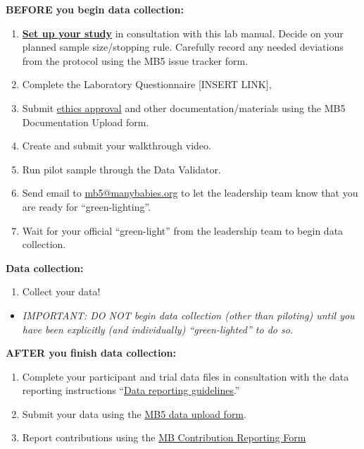 \documentclass[
]{book}
\providecommand{\tightlist}{%
  \setlength{\itemsep}{0pt}\setlength{\parskip}{0pt}}
\begin{document}
\textbf{BEFORE you begin data collection:}

\begin{enumerate}
\def\labelenumi{\arabic{enumi}.}
\setcounter{enumi}{3}
\tightlist
\item
  \hyperref[setting-up-the-experiment]{\textbf{Set up your study}} in consultation with this lab manual. Decide on your planned sample size/stopping rule. Carefully record any needed deviations from the protocol using the MB5 issue tracker form.
\item
  Complete the Laboratory Questionnaire {[}INSERT LINK{]},
\item
  Submit \hyperref[ethics-approval]{ethics approval} and other documentation/materials using the MB5 Documentation Upload form.
\item
  Create and submit your walkthrough video.
\item
  Run pilot sample through the Data Validator.
\item
  Send email to \url{mb5@manybabies.org} to let the leadership team know that you are ready for ``green-lighting''.
\item
  Wait for your official ``green-light'' from the leadership team to begin data collection.
\end{enumerate}

\textbf{Data collection:}

\begin{enumerate}
\def\labelenumi{\arabic{enumi}.}
\setcounter{enumi}{10}
\tightlist
\item
  Collect your data!
\end{enumerate}

\begin{itemize}
\tightlist
\item
  \emph{IMPORTANT: DO NOT begin data collection (other than piloting) until you have been explicitly (and individually) ``green-lighted'' to do so.}
\end{itemize}

\textbf{AFTER you finish data collection:}

\begin{enumerate}
\def\labelenumi{\arabic{enumi}.}
\setcounter{enumi}{11}
\tightlist
\item
  Complete your participant and trial data files in consultation with the data reporting instructions ``\hyperref[data-reporting-guidelines]{Data reporting guidelines}.''
\item
  Submit your data using the \href{https://docs.google.com/forms/d/e/1FAIpQLSdFYk-gb4yjRYLjSTP1_BVaW-3vLkpJClLoY2BOGDGfIVE5ww/viewform?usp=sf_link}{MB5 data upload form}.
\item
  Report contributions using the \href{https://manybabies.org/credit/}{MB Contribution Reporting Form}
\end{enumerate}
\end{document}
